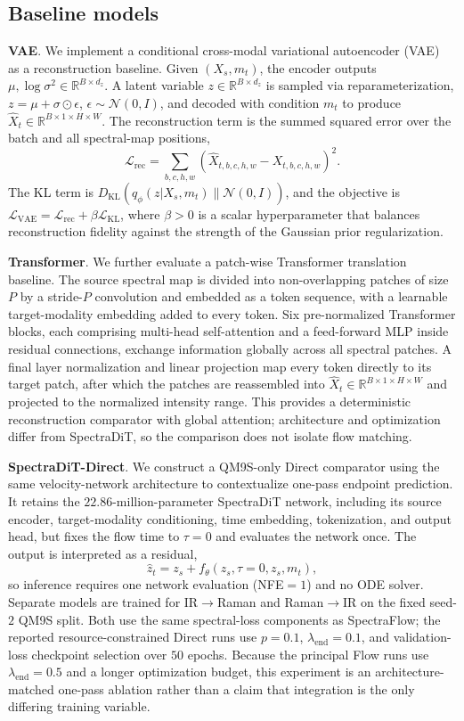 \documentclass[pdflatex,sn-mathphys-num]{sn-jnl}%
\newcommand{\mname}{SpectraFlow}
\theoremstyle{thmstyleone}%
\theoremstyle{thmstyletwo}%
\theoremstyle{thmstylethree}%
\begin{document}
\subsection*{Baseline models}

\noindent\textbf{VAE}. We implement a conditional cross-modal variational autoencoder (VAE)~\cite{kingma2014auto} as a reconstruction baseline.
Given $(X_s,m_t)$, the encoder outputs
$\mu,\log \sigma^2\in\mathbb{R}^{B\times d_z}$.
A latent variable $z\in\mathbb{R}^{B\times d_z}$ is sampled via reparameterization,
$z=\mu+\sigma\odot\epsilon$, $\epsilon\sim\mathcal{N}(0,I)$,
and decoded with condition $m_t$ to produce
$\hat{X}_t\in\mathbb{R}^{B\times 1\times H\times W}$.
The reconstruction term is the summed squared error over the batch and all spectral-map positions,
\[
\mathcal{L}_{\mathrm{rec}}
=
\sum_{b,c,h,w}
\left(
\hat{X}_{t,b,c,h,w}-X_{t,b,c,h,w}
\right)^2 .
\]
The KL term is
$D_{\mathrm{KL}}(q_\phi(z|X_s,m_t)\| \mathcal{N}(0,I))$,
and the objective is
$\mathcal{L}_{\mathrm{VAE}}=\mathcal{L}_{\mathrm{rec}}+\beta \mathcal{L}_{\mathrm{KL}}$, where $\beta>0$ is a scalar hyperparameter that balances reconstruction fidelity against the strength of the Gaussian prior regularization.

\noindent\textbf{Transformer}.
We further evaluate a patch-wise Transformer translation baseline. The source spectral map is divided into non-overlapping patches of size $P$ by a stride-$P$ convolution and embedded as a token sequence, with a learnable target-modality embedding added to every token. Six pre-normalized Transformer blocks, each comprising multi-head self-attention and a feed-forward MLP inside residual connections, exchange information globally across all spectral patches. A final layer normalization and linear projection map every token directly to its target patch, after which the patches are reassembled into $\hat{X}_t\in\mathbb{R}^{B\times 1\times H\times W}$ and projected to the normalized intensity range. This provides a deterministic reconstruction comparator with global attention; architecture and optimization differ from SpectraDiT, so the comparison does not isolate flow matching.

\noindent\textbf{SpectraDiT-Direct}.
We construct a QM9S-only Direct comparator using the same velocity-network architecture to contextualize one-pass endpoint prediction. It retains the $22.86$-million-parameter SpectraDiT network, including its source encoder, target-modality conditioning, time embedding, tokenization, and output head, but fixes the flow time to $\tau=0$ and evaluates the network once. The output is interpreted as a residual,
\[
\hat z_t=z_s+f_\theta(z_s,\tau=0,z_s,m_t),
\]
so inference requires one network evaluation (NFE${}=1$) and no ODE solver. Separate models are trained for IR$\rightarrow$Raman and Raman$\rightarrow$IR on the fixed seed-$2$ QM9S split. Both use the same spectral-loss components as \mname; the reported resource-constrained Direct runs use $p=0.1$, $\lambda_{\mathrm{end}}=0.1$, and validation-loss checkpoint selection over $50$ epochs. Because the principal Flow runs use $\lambda_{\mathrm{end}}=0.5$ and a longer optimization budget, this experiment is an architecture-matched one-pass ablation rather than a claim that integration is the only differing training variable.
\end{document}
